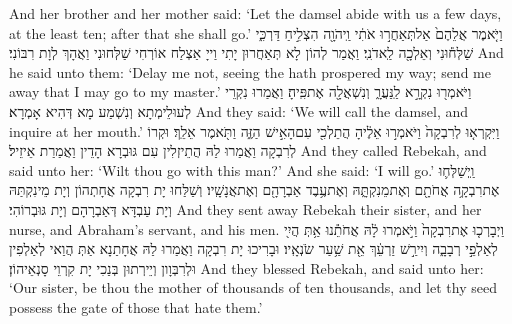 {And her brother and her mother said: ‘Let the damsel abide with us a few days, at the least ten; after that she shall go.’}{}
{וַיֹּ֤אמֶר אֲלֵהֶם֙ אַל\maqqaf תְּאַחֲר֣וּ אֹתִ֔י וַֽיהֹוָ֖ה הִצְלִ֣יחַ דַּרְכִּ֑י שַׁלְּח֕וּנִי וְאֵלְכָ֖ה לַֽאדֹנִֽי׃}
{וַאֲמַר לְהוֹן לָא תְּאַחֲרוּן יָתִי וַייָ אַצְלַח אוֹרְחִי שַׁלְּחוּנִי וַאֲהָךְ לְוָת רִבּוֹנִי׃}
{And he said unto them: ‘Delay me not, seeing the \lord\space hath prospered my way; send me away that I may go to my master.’}{}
{וַיֹּאמְר֖וּ נִקְרָ֣א לַֽנַּעֲרָ֑ וְנִשְׁאֲלָ֖ה אֶת\maqqaf פִּֽיהָ׃}
{וַאֲמַרוּ נִקְרֵי לְעוּלֵימְתָא וְנִשְׁמַע מָא דְּהִיא אָמְרָא׃}
{And they said: ‘We will call the damsel, and inquire at her mouth.’}{}
{וַיִּקְרְא֤וּ לְרִבְקָה֙ וַיֹּאמְר֣וּ אֵלֶ֔יהָ הֲתֵלְכִ֖י עִם\maqqaf הָאִ֣ישׁ הַזֶּ֑ה וַתֹּ֖אמֶר אֵלֵֽךְ׃}
{וּקְרוֹ לְרִבְקָה וַאֲמַרוּ לַהּ הֲתֵיזְלִין עִם גּוּבְרָא הָדֵין וַאֲמַרַת אֵיזֵיל׃}
{And they called Rebekah, and said unto her: ‘Wilt thou go with this man?’ And she said: ‘I will go.’}{}
{וַֽיְשַׁלְּח֛וּ אֶת\maqqaf רִבְקָ֥ה אֲחֹתָ֖ם וְאֶת\maqqaf מֵנִקְתָּ֑הּ וְאֶת\maqqaf עֶ֥בֶד אַבְרָהָ֖ם וְאֶת\maqqaf אֲנָשָֽׁיו׃}
{וְשַׁלַּחוּ יָת רִבְקָה אֲחָתְהוֹן וְיָת מֵינִקְתַּהּ וְיָת עַבְדָּא דְּאַבְרָהָם וְיָת גּוּבְרוֹהִי׃}
{And they sent away Rebekah their sister, and her nurse, and Abraham’s servant, and his men.}{}
{וַיְבָרְכ֤וּ אֶת\maqqaf רִבְקָה֙ וַיֹּ֣אמְרוּ לָ֔הּ אֲחֹתֵ֕נוּ אַ֥תְּ הֲיִ֖י לְאַלְפֵ֣י רְבָבָ֑ה וְיִירַ֣שׁ זַרְעֵ֔ךְ אֵ֖ת שַׁ֥עַר שֹׂנְאָֽיו׃}
{וּבָרִיכוּ יָת רִבְקָה וַאֲמַרוּ לַהּ אֲחָתַנָא אַתְּ הֲוַאי לְאַלְפִין וּלְרִבְּוָון וְיֵירְתוּן בְּנַכִי יָת קִרְוֵי סָנְאֵיהוֹן׃}
{And they blessed Rebekah, and said unto her: ‘Our sister, be thou the mother of thousands of ten thousands, and let thy seed possess the gate of those that hate them.’}{}
